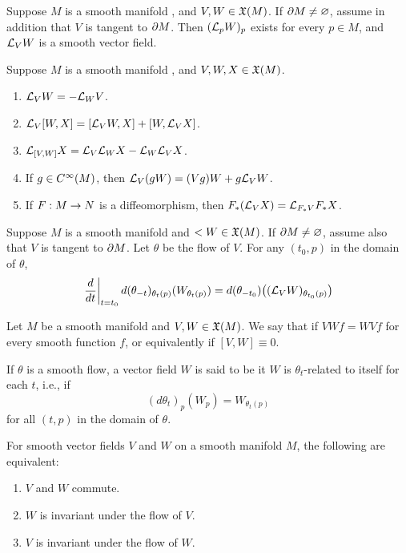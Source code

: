 \begin{lem}
Suppose $M$ is a smooth manifold \wowob, and $V,W\in \mathfrak{X}(M)$. If $\partial M\neq \varnothing$, assume in addition that $V$ is tangent to $\partial M$. Then $(\mathcal{L}_pW)_p$ exists for every $p\in M$, and $\mathcal{L}_V W$ is a smooth vector field.
\end{lem}

\setcounter{thm}{37}

\begin{thm}
\end{thm}


\begin{cor}
Suppose $M$ is a smooth manifold \wowob, and $V,W,X\in \mathfrak{X}(M)$.
\begin{enumerate}
    \item $\mathcal{L}_V W = - \mathcal{L}_W V$.
    \item $\mathcal{L}_V [W,X] = [\mathcal{L}_VW,X] + [W,\mathcal{L}_VX]$.
    \item $\mathcal{L}_{[V,W]}X = \mathcal{L}_V\mathcal{L}_W X - \mathcal{L}_W\mathcal{L}_V X$.
    \item If $g\in C^\infty(M)$, then $\mathcal{L}_V(gW) = (Vg)W + g\mathcal{L}_VW$.
    \item If $F:M\rightarrow N$ is a diffeomorphism, then $F_*(\mathcal{L}_VX) = \mathcal{L}_{F_*V}F_*X$.
\end{enumerate}
\end{cor}

\setcounter{thm}{40}

\begin{prop}
Suppose $M$ is a smooth manifold \wowob and $<W\in \mathfrak{X}(M)$. If $\partial M \neq \varnothing$, assume also that $V$ is tangent to $\partial M$. Let $\theta$ be the flow of $V$. For any $(t_0, p)$ in the domain of $\theta$,
\[\left. \frac{d}{dt}\right|_{t = t_0}d(\theta_{-t})_{\theta_t(p)}(W_{\theta_t(p)}) = d(\theta_{-t_0})\big((\mathcal{L}_V W)_{\theta_{t_0}(p)}\big)\]
\end{prop}

\dfng Let $M$ be a smooth manifold and $V,W\in \mathfrak{X}(M)$. We say that  if $VWf = WVf$ for every smooth function $f$, or equivalently if $[V,W] \equiv 0$.

\dfn If $\theta$ is a smooth flow, a vector field $W$ is said to be  it $W$ is $\theta_t$-related to itself for each $t$, i.e., if
\[(d\theta_t)_p(W_p) = W_{\theta_t(p)}\]
for all $(t,p)$ in the domain of $\theta$.

\begin{thm}
For smooth vector fields $V$ and $W$ on a smooth manifold $M$, the following are equivalent:
\begin{enumerate}
    \item $V$ and $W$ commute.
    \item $W$ is invariant under the flow of $V$.
    \item $V$ is invariant under the flow of $W$.
\end{enumerate}
\end{thm}

